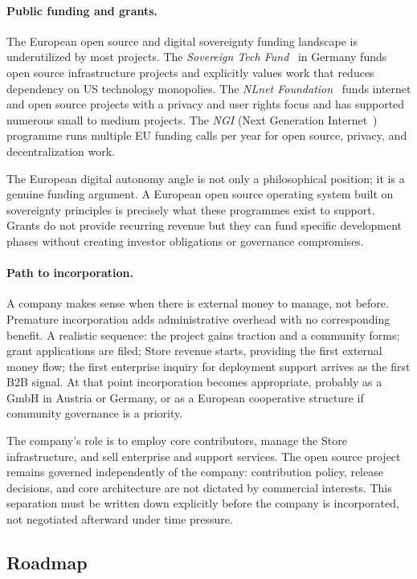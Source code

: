 \paragraph{Public funding and grants.}
The European open source and digital sovereignty funding landscape is
underutilized by most projects. The \emph{Sovereign Tech Fund}~\cite{stf} in Germany funds open source
infrastructure projects and explicitly values work that reduces dependency on
US technology monopolies. The \emph{NLnet Foundation}~\cite{nlnet} funds internet and open source
projects with a privacy and user rights focus and has supported numerous small
to medium projects. The \emph{NGI} (Next Generation Internet~\cite{ngi}) programme runs
multiple EU funding calls per year for open source, privacy, and
decentralization work.

The European digital autonomy angle is not only a philosophical position; it is
a genuine funding argument. A European open source operating system built on
sovereignty principles is precisely what these programmes exist to support.
Grants do not provide recurring revenue but they can fund specific development
phases without creating investor obligations or governance compromises.

\paragraph{Path to incorporation.}
A company makes sense when there is external money to manage, not before.
Premature incorporation adds administrative overhead with no corresponding
benefit. A realistic sequence: the project gains traction and a community
forms; grant applications are filed; Store revenue starts, providing the first
external money flow; the first enterprise inquiry for deployment support
arrives as the first B2B signal. At that point incorporation becomes
appropriate, probably as a GmbH in Austria or Germany, or as a European
cooperative structure if community governance is a priority.

The company's role is to employ core contributors, manage the Store
infrastructure, and sell enterprise and support services. The open source
project remains governed independently of the company: contribution policy,
release decisions, and core architecture are not dictated by commercial
interests. This separation must be written down explicitly before the company
is incorporated, not negotiated afterward under time pressure.

\subsection{Roadmap}
\label{sec:roadmap}

